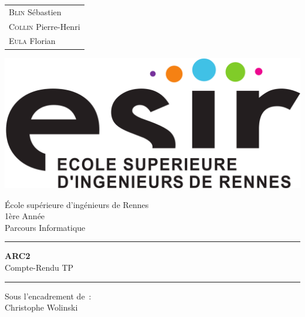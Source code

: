\documentclass{article}
\begin{document}
\begin{titlepage}
	\vspace{-20px}
	\begin{tabular}{l}
    \textsc{Blin} S\'ebastien\\
    \textsc{Collin} Pierre-Henri\\
    \textsc{Eula} Florian
	\end{tabular}
	\hfill \vspace{10px}\includegraphics[scale=0.1]{esir.png}\\
	\vfill
	\begin{center}
    \Huge{\'Ecole sup\'erieure d'ing\'enieurs de Rennes}\\
    \vspace{1cm}
    \LARGE{1\`ere Ann\'ee}\\
    \large{Parcours Informatique}\\
    \vspace{0.5cm}\hrule\vspace{0.5cm}
    \LARGE{\textbf{ARC2}}\\
    \Large{Compte-Rendu TP }
    \vspace{0.5cm}\hrule
    \vfill
    \vfill
	\end{center}
	\begin{flushleft}
    \Large{Sous l'encadrement de~:}\\
    \vspace{0.2cm}
    \large{{Christophe} Wolinski}
	\end{flushleft}
	\vfill
\end{titlepage}
\end{document}
